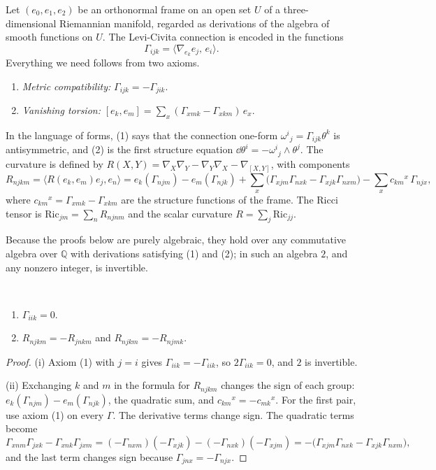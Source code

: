 Let $(e_0,e_1,e_2)$ be an orthonormal frame on an open set $U$ of a three-dimensional Riemannian manifold, regarded as derivations of the algebra of smooth functions on $U$. The Levi-Civita connection is encoded in the functions
\[
\Gamma_{ijk}=\langle\nabla_{e_k}e_j,\,e_i\rangle .
\]
Everything we need follows from two axioms.
\begin{enumerate}[label=(\arabic*)]
\item \emph{Metric compatibility:} $\Gamma_{ijk}=-\Gamma_{jik}$.
\item \emph{Vanishing torsion:} $[e_k,e_m]=\sum_x(\Gamma_{xmk}-\Gamma_{xkm})\,e_x$.
\end{enumerate}
In the language of forms, (1) says that the connection one-form $\omega^i{}_j=\Gamma_{ijk}\theta^k$ is antisymmetric, and (2) is the first structure equation $\dd\theta^i=-\omega^i{}_j\wedge\theta^j$. The curvature is defined by $R(X,Y)=\nabla_X\nabla_Y-\nabla_Y\nabla_X-\nabla_{[X,Y]}$, with components
\[
R_{njkm}=\langle R(e_k,e_m)e_j,e_n\rangle=e_k(\Gamma_{njm})-e_m(\Gamma_{njk})+\sum_x\bigl(\Gamma_{xjm}\Gamma_{nxk}-\Gamma_{xjk}\Gamma_{nxm}\bigr)-\sum_x c_{km}{}^x\,\Gamma_{njx},
\]
where $c_{km}{}^x=\Gamma_{xmk}-\Gamma_{xkm}$ are the structure functions of the frame. The Ricci tensor is $\mathrm{Ric}_{jm}=\sum_nR_{njnm}$ and the scalar curvature $R=\sum_j\mathrm{Ric}_{jj}$.

Because the proofs below are purely algebraic, they hold over any commutative algebra over $\mathbb Q$ with derivations satisfying (1) and (2); in such an algebra $2$, and any nonzero integer, is invertible.

\begin{proposition}\label{prop:frame}\ver\
\begin{enumerate}[label=(\roman*)]
\item $\Gamma_{iik}=0$.
\item $R_{njkm}=-R_{jnkm}$ and $R_{njkm}=-R_{njmk}$.
\end{enumerate}
\end{proposition}
\begin{proof}
(i) Axiom (1) with $j=i$ gives $\Gamma_{iik}=-\Gamma_{iik}$, so $2\Gamma_{iik}=0$, and $2$ is invertible.

(ii) Exchanging $k$ and $m$ in the formula for $R_{njkm}$ changes the sign of each group: $e_k(\Gamma_{njm})-e_m(\Gamma_{njk})$, the quadratic sum, and $c_{km}{}^x=-c_{mk}{}^x$. For the first pair, use axiom (1) on every $\Gamma$. The derivative terms change sign. The quadratic terms become
\[
\Gamma_{xnm}\Gamma_{jxk}-\Gamma_{xnk}\Gamma_{jxm}=(-\Gamma_{nxm})(-\Gamma_{xjk})-(-\Gamma_{nxk})(-\Gamma_{xjm})=-\bigl(\Gamma_{xjm}\Gamma_{nxk}-\Gamma_{xjk}\Gamma_{nxm}\bigr),
\]
and the last term changes sign because $\Gamma_{jnx}=-\Gamma_{njx}$.
\end{proof}


